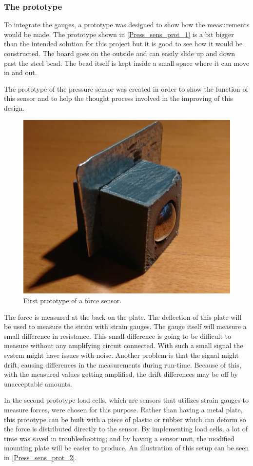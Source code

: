 \subsubsection{The prototype}
To integrate the gauges, a prototype was designed to show how the measurements would be made. The prototype shown in \autoref{Press_sens_prot_1} is a bit bigger than the intended solution for this project but it is good to see how it would be constructed. The board goes on the outside and can easily slide up and down past the steel bead. The bead itself is kept inside a small space where it can move in and out.

The prototype of the pressure sensor was created in order to show the function of this sensor and to help the thought process involved in the improving of this design.

\begin{figure}[H]
\begin{center}
	\includegraphics[width = .45\textwidth]{Figures/Press_sens_prot_1.jpg}
	\caption{First prototype of a force sensor.}
	\label{Press_sens_prot_1}
\end{center}
\end{figure}

The force is measured at the back on the plate. The deflection of this plate will be used to measure the strain with strain gauges. 
The gauge itself will measure a small difference in resistance. This small difference is going to be difficult to measure without any amplifying circuit connected. With such a small signal the system might have issues with noise. Another problem is that the signal might drift, causing differences in the measurements during run-time. Because of this, with the measured values getting amplified, the drift differences may be off by unacceptable amounts. 

In the second prototype load cells, which are sensors that utilizes strain gauges to measure forces, were chosen for this purpose. Rather than having a metal plate, this prototype can be built with a piece of plastic or rubber which can deform so the force is distributed directly to the sensor. By implementing load cells, a lot of time was saved in troubleshooting; and by having a sensor unit, the modified mounting plate will be easier to produce. An illustration of this setup can be seen in \autoref{Press_sens_prot_2}.
 
